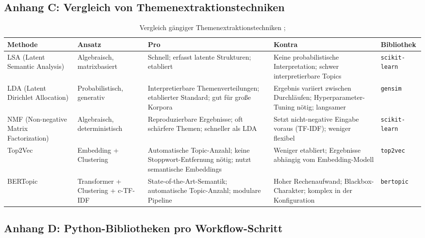 \documentclass[a4paper,11pt]{article}
\renewcommand{\footnotesize}{\fontsize{10}{12}\selectfont}
\begin{document}
\subsection*{Anhang C: Vergleich von Themenextraktionstechniken}

\begin{table}[H]
\centering
\caption{Vergleich gängiger Themenextraktionstechniken \parencite[S.~13--15]{egger2022topic}; \parencite[S.~4--5]{albalawi2020topic}}
\label{tab:themenextraktion}
\footnotesize
\setlength{\parskip}{0pt}
\renewcommand{\arraystretch}{1.4}
\begin{tabular}{>{\raggedright\arraybackslash}p{2.2cm} p{2.0cm} p{3.2cm} p{3.2cm} p{2.2cm}}
\toprule
\textbf{Methode} & \textbf{Ansatz} & \textbf{Pro} & \textbf{Kontra} & \textbf{Bibliothek} \\
\midrule
LSA (Latent Semantic Analysis) & Algebraisch, matrixbasiert & Schnell; erfasst latente Strukturen; etabliert & Keine probabilistische Interpretation; schwer interpretierbare Topics & \texttt{scikit-learn} \\
\hline
LDA (Latent Dirichlet Allocation) & Probabilistisch, generativ & Interpretierbare Themenverteilungen; etablierter Standard; gut für große Korpora & Ergebnis variiert zwischen Durchläufen; Hyperparameter-Tuning nötig; langsamer & \texttt{gensim} \\
\hline
NMF (Non-negative Matrix Factorization) & Algebraisch, deterministisch & Reproduzierbare Ergebnisse; oft schärfere Themen; schneller als LDA & Setzt nicht-negative Eingabe voraus (TF-IDF); weniger flexibel & \texttt{scikit-learn} \\
\hline
Top2Vec & Embedding + Clustering & Automatische Topic-Anzahl; keine Stoppwort-Entfernung nötig; nutzt semantische Embeddings & Weniger etabliert; Ergebnisse abhängig vom Embedding-Modell & \texttt{top2vec} \\
\hline
BERTopic & Transformer + Clustering + c-TF-IDF & State-of-the-Art-Semantik; automatische Topic-Anzahl; modulare Pipeline & Hoher Rechenaufwand; Blackbox-Charakter; komplex in der Konfiguration & \texttt{bertopic} \\
\bottomrule
\end{tabular}
\end{table}

\subsection*{Anhang D: Python-Bibliotheken pro Workflow-Schritt}
\end{document}
